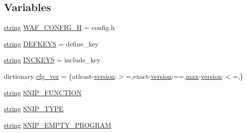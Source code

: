 \subsection*{Variables}
\begin{DoxyCompactItemize}
\item 
\hyperlink{test__lib_f_l_a_c_2format_8c_ab02026ad0de9fb6c1b4233deb0a00c75}{string} \hyperlink{namespacewaflib_1_1_tools_1_1c__config_a3524a3b67232f4884bd06e093c27ab1a}{W\+A\+F\+\_\+\+C\+O\+N\+F\+I\+G\+\_\+H} = \textquotesingle{}config.\+h\textquotesingle{}
\item 
\hyperlink{test__lib_f_l_a_c_2format_8c_ab02026ad0de9fb6c1b4233deb0a00c75}{string} \hyperlink{namespacewaflib_1_1_tools_1_1c__config_a423497940f1079ce7d47a2bc7c2f3d21}{D\+E\+F\+K\+E\+YS} = \textquotesingle{}define\+\_\+key\textquotesingle{}
\item 
\hyperlink{test__lib_f_l_a_c_2format_8c_ab02026ad0de9fb6c1b4233deb0a00c75}{string} \hyperlink{namespacewaflib_1_1_tools_1_1c__config_a4fe2646ae07d79f9418b071ee264aec0}{I\+N\+C\+K\+E\+YS} = \textquotesingle{}include\+\_\+key\textquotesingle{}
\item 
dictionary \hyperlink{namespacewaflib_1_1_tools_1_1c__config_a41821fd2ecc9c5265c2d31301cfd9303}{cfg\+\_\+ver} = \{\textquotesingle{}atleast-\/\hyperlink{lib_2expat_8h_aec5db107b91447a96c47961ce9df2660}{version}\textquotesingle{}\+:\textquotesingle{}$>$=\textquotesingle{},\textquotesingle{}exact-\/\hyperlink{lib_2expat_8h_aec5db107b91447a96c47961ce9df2660}{version}\textquotesingle{}\+:\textquotesingle{}==\textquotesingle{},\textquotesingle{}\hyperlink{_t_d_stretch_8cpp_ac39d9cef6a5e030ba8d9e11121054268}{max}-\/\hyperlink{lib_2expat_8h_aec5db107b91447a96c47961ce9df2660}{version}\textquotesingle{}\+:\textquotesingle{}$<$=\textquotesingle{},\}
\item 
\hyperlink{test__lib_f_l_a_c_2format_8c_ab02026ad0de9fb6c1b4233deb0a00c75}{string} \hyperlink{namespacewaflib_1_1_tools_1_1c__config_aba4bf5acf1c994ec99338c25174607df}{S\+N\+I\+P\+\_\+\+F\+U\+N\+C\+T\+I\+ON}
\item 
\hyperlink{test__lib_f_l_a_c_2format_8c_ab02026ad0de9fb6c1b4233deb0a00c75}{string} \hyperlink{namespacewaflib_1_1_tools_1_1c__config_a2f923f3246fb11481182f2cf86545ae3}{S\+N\+I\+P\+\_\+\+T\+Y\+PE}
\item 
\hyperlink{test__lib_f_l_a_c_2format_8c_ab02026ad0de9fb6c1b4233deb0a00c75}{string} \hyperlink{namespacewaflib_1_1_tools_1_1c__config_af47bf63341f9323a7713ac4d2539fdb7}{S\+N\+I\+P\+\_\+\+E\+M\+P\+T\+Y\+\_\+\+P\+R\+O\+G\+R\+AM}
\item 

\end{DoxyCompactItemize}
